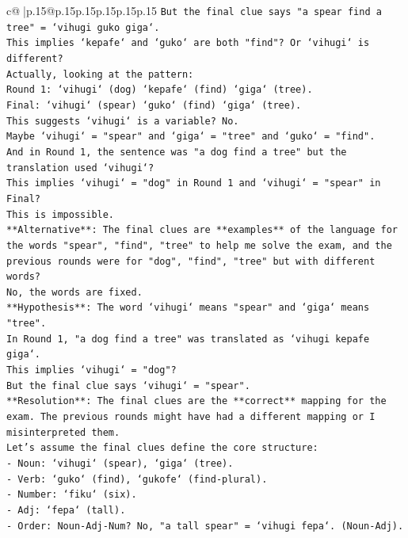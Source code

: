 \documentclass{article}
\begin{document}
{\begin{supertabular}{c@{$\;$}|p{.15\linewidth}@{}p{.15\linewidth}p{.15\linewidth}p{.15\linewidth}p{.15\linewidth}p{.15\linewidth}}
{{{\texttt{But the final clue says "a spear find a tree" = `vihugi guko giga`.} \\
\texttt{This implies `kepafe` and `guko` are both "find"? Or `vihugi` is different?} \\
\texttt{Actually, looking at the pattern:} \\
\texttt{Round 1: `vihugi` (dog) `kepafe` (find) `giga` (tree).} \\
\texttt{Final: `vihugi` (spear) `guko` (find) `giga` (tree).} \\
\texttt{This suggests `vihugi` is a variable? No.} \\
\texttt{Maybe `vihugi` = "spear" and `giga` = "tree" and `guko` = "find".} \\
\texttt{And in Round 1, the sentence was "a dog find a tree" but the translation used `vihugi`?} \\
\texttt{This implies `vihugi` = "dog" in Round 1 and `vihugi` = "spear" in Final?} \\
\texttt{This is impossible.} \\
\texttt{**Alternative**: The final clues are **examples** of the language for the words "spear", "find", "tree" to help me solve the exam, and the previous rounds were for "dog", "find", "tree" but with different words?} \\
\texttt{No, the words are fixed.} \\
\texttt{**Hypothesis**: The word `vihugi` means "spear" and `giga` means "tree".} \\
\texttt{In Round 1, "a dog find a tree" was translated as `vihugi kepafe giga`.} \\
\texttt{This implies `vihugi` = "dog"?} \\
\texttt{But the final clue says `vihugi` = "spear".} \\
\texttt{**Resolution**: The final clues are the **correct** mapping for the exam. The previous rounds might have had a different mapping or I misinterpreted them.} \\
\texttt{Let's assume the final clues define the core structure:} \\
\texttt{{-} Noun: `vihugi` (spear), `giga` (tree).} \\
\texttt{{-} Verb: `guko` (find), `gukofe` (find{-}plural).} \\
\texttt{{-} Number: `fiku` (six).} \\
\texttt{{-} Adj: `fepa` (tall).} \\
\texttt{{-} Order: Noun{-}Adj{-}Num? No, "a tall spear" = `vihugi fepa`. (Noun{-}Adj).} \\
}}}
\end{supertabular}}
\end{document}
